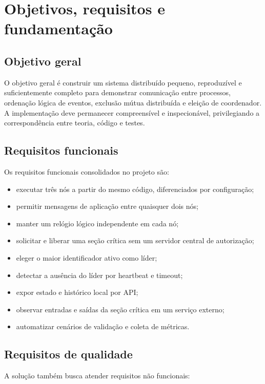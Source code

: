 \section{Objetivos, requisitos e fundamentação}
\label{sec:objetivos}

\subsection{Objetivo geral}

O objetivo geral é construir um sistema distribuído pequeno, reproduzível e suficientemente completo para demonstrar comunicação entre processos, ordenação lógica de eventos, exclusão mútua distribuída e eleição de coordenador. A implementação deve permanecer compreensível e inspecionável, privilegiando a correspondência entre teoria, código e testes.

\subsection{Requisitos funcionais}

Os requisitos funcionais consolidados no projeto são:

\begin{itemize}
    \item executar três nós a partir do mesmo código, diferenciados por configuração;
    \item permitir mensagens de aplicação entre quaisquer dois nós;
    \item manter um relógio lógico independente em cada nó;
    \item solicitar e liberar uma seção crítica sem um servidor central de autorização;
    \item eleger o maior identificador ativo como líder;
    \item detectar a ausência do líder por heartbeat e timeout;
    \item expor estado e histórico local por API;
    \item observar entradas e saídas da seção crítica em um serviço externo;
    \item automatizar cenários de validação e coleta de métricas.
\end{itemize}

\subsection{Requisitos de qualidade}

A solução também busca atender requisitos não funcionais:

